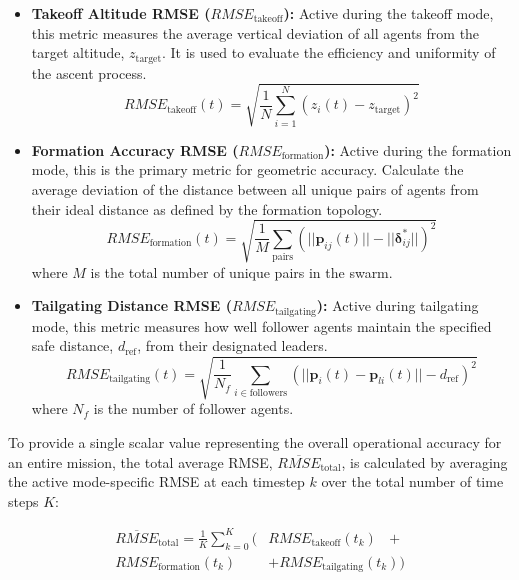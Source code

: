 \documentclass[pdflatex,sn-basic]{sn-jnl}%
\begin{document}
            \begin{itemize}
                \item \textbf{Takeoff Altitude RMSE ($RMSE_{\text{takeoff}}$):} Active during the takeoff mode, this metric measures the average vertical deviation of all agents from the target altitude, $z_{\text{target}}$. It is used to evaluate the efficiency and uniformity of the ascent process.
                \begin{equation}
                    RMSE_{\text{takeoff}}(t)=\sqrt{\frac{1}{N}\sum_{i=1}^{N}(z_{i}(t)-z_{\text{target}})^{2}}
                \end{equation}

                \item \textbf{Formation Accuracy RMSE ($RMSE_{\text{formation}}$):} Active during the formation mode, this is the primary metric for geometric accuracy. Calculate the average deviation of the distance between all unique pairs of agents from their ideal distance as defined by the formation topology.
                \begin{equation}
                    RMSE_{\text{formation}}(t)=\sqrt{\frac{1}{M}\sum_{\text{pairs}}(||\boldsymbol{p}_{ij}(t)||-||\boldsymbol{\delta}_{ij}^{*}||)^{2}}
                \end{equation}
                where $M$ is the total number of unique pairs in the swarm.

                \item \textbf{Tailgating Distance RMSE ($RMSE_{\text{tailgating}}$):} Active during tailgating mode, this metric measures how well follower agents maintain the specified safe distance, $d_{\text{ref}}$, from their designated leaders.
                \begin{equation}
                    RMSE_{\text{tailgating}}(t)=\sqrt{\frac{1}{N_{f}}\sum_{i\in \text{followers}}(||\boldsymbol{p}_{i}(t)-\boldsymbol{p}_{li}(t)||-d_{\text{ref}})^{2}}
                \end{equation}
                where $N_f$ is the number of follower agents.
            \end{itemize}

            To provide a single scalar value representing the overall operational accuracy for an entire mission, the total average RMSE, $\overline{RMSE}_{\text{total}}$, is calculated by averaging the active mode-specific RMSE at each timestep $k$ over the total number of time steps $K$:

            \begin{equation}
            \begin{aligned}
                \overline{RMSE}_{\text{total}} = \frac{1}{K}\sum_{k=0}^{K} ( & RMSE_{\text{takeoff}}(t_{k})\text{ } +\\
                RMSE_{\text{formation}}(t_{k})
                & + RMSE_{\text{tailgating}}(t_{k}))
            \end{aligned}
            \end{equation}
\end{document}
